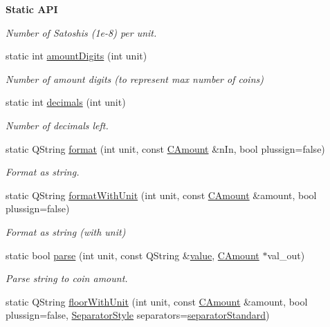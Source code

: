 \begin{Indent}{\bf Static A\+P\+I}
\begin{DoxyCompactItemize}
\begin{DoxyCompactList}\small\item\em Number of Satoshis (1e-\/8) per unit. \end{DoxyCompactList}\item 
static int \hyperlink{class_dark_silk_units_a4baa85df1203cf74de5bafd77eb04ebe}{amount\+Digits} (int unit)
\begin{DoxyCompactList}\small\item\em Number of amount digits (to represent max number of coins) \end{DoxyCompactList}\item 
static int \hyperlink{class_dark_silk_units_a5cf347a021d0239b0a955073e6dd9290}{decimals} (int unit)
\begin{DoxyCompactList}\small\item\em Number of decimals left. \end{DoxyCompactList}\item 
static Q\+String \hyperlink{class_dark_silk_units_a87f64ca983a23ac8c836954d6b7ef080}{format} (int unit, const \hyperlink{amount_8h_a4eaf3a5239714d8c45b851527f7cb564}{C\+Amount} \&n\+In, bool plussign=false)
\begin{DoxyCompactList}\small\item\em Format as string. \end{DoxyCompactList}\item 
static Q\+String \hyperlink{class_dark_silk_units_a8bd68e4e42a5652886e1c73c6c1bc19d}{format\+With\+Unit} (int unit, const \hyperlink{amount_8h_a4eaf3a5239714d8c45b851527f7cb564}{C\+Amount} \&amount, bool plussign=false)
\begin{DoxyCompactList}\small\item\em Format as string (with unit) \end{DoxyCompactList}\item 
static bool \hyperlink{class_dark_silk_units_a11d6661d65f2fe22fb17716b509cb135}{parse} (int unit, const Q\+String \&\hyperlink{cache_8cc_a0f61d63b009d0880a89c843bd50d8d76}{value}, \hyperlink{amount_8h_a4eaf3a5239714d8c45b851527f7cb564}{C\+Amount} $\ast$val\+\_\+out)
\begin{DoxyCompactList}\small\item\em Parse string to coin amount. \end{DoxyCompactList}\item 
static Q\+String \hyperlink{class_dark_silk_units_ad03892765fad5d073a894f8cd4f1a2ef}{floor\+With\+Unit} (int unit, const \hyperlink{amount_8h_a4eaf3a5239714d8c45b851527f7cb564}{C\+Amount} \&amount, bool plussign=false, \hyperlink{class_dark_silk_units_a492e7b4a5708e04f3a97609c07b733b9}{Separator\+Style} separators=\hyperlink{class_dark_silk_units_a492e7b4a5708e04f3a97609c07b733b9a9cb3f6f5405413dc7960959c15cb5d6c}{separator\+Standard})

\end{DoxyCompactItemize}
\end{Indent}
